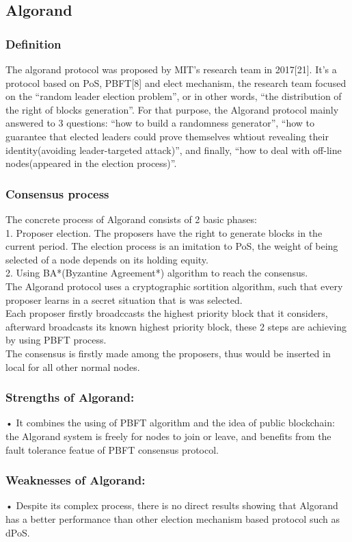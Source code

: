 \documentclass[doublespacing]{bmcart}
\begin{document}
\begin{CJK*}{UTF8}{gbsn}
	\subsection{Algorand}
	\subsubsection*{Definition}  
	The algorand protocol was proposed by MIT's research team in 2017[21]. It's a protocol based on PoS, PBFT[8] and elect mechanism, the research team focused on the ``random leader election problem'', or in other words, ``the distribution of the right of blocks generation''. For that purpose, the Algorand protocol mainly answered to 3 questions: ``how to build a randomness generator'', ``how to guarantee that elected leaders could prove themselves whtiout revealing their identity(avoiding leader-targeted attack)'', and finally, ``how to deal with off-line nodes(appeared in the election process)''.
	\subsubsection*{Consensus process}
	The concrete process of Algorand consists of 2 basic phases: 
	\\1. Proposer election. The proposers have the right to generate blocks in the current period. The election process is an imitation to PoS, the weight of being selected of a node depends on its holding equity.
	\\2. Using BA*(Byzantine Agreement*) algorithm to reach the consensus.
	\\The Algorand protocol uses a  cryptographic sortition algorithm, such that every proposer learns in a secret situation that is was selected.	
	\\Each proposer firstly broadccasts the highest priority block that it considers, afterward broadcasts its known highest priority block, these 2 steps are achieving by using PBFT process.
	\\The consensus is firstly made among the proposers, thus would be inserted in local for all other normal nodes. 
\subsubsection*{Strengths of Algorand:}	
• It combines the using of PBFT algorithm and the idea of public blockchain: the Algorand system is freely for nodes to join or leave, and benefits from the fault tolerance featue of PBFT consensus protocol.
\subsubsection*{Weaknesses of Algorand:}
• Despite its complex process, there is no direct results showing that Algorand has a better performance than other election mechanism based protocol such as dPoS.


\end{CJK*}
\end{document}
